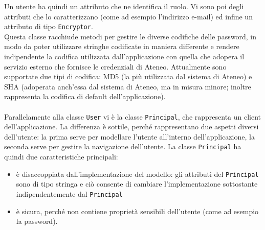 Un utente ha quindi un attributo che ne identifica il ruolo. Vi sono poi degli attributi che lo caratterizzano (come ad esempio l'indirizzo e-mail) ed infine un attributo di tipo \texttt{Encryptor}. \\
Questa classe racchiude metodi per gestire le diverse codifiche delle password, in modo da poter utilizzare stringhe codificate in maniera differente e rendere indipendente la codifica utilizzata dall'applicazione con quella che adopera il servizio esterno che fornisce le credenziali di Ateneo. Attualmente sono supportate due tipi di codifica: MD5 (la più utilizzata dal sistema di Ateneo) e SHA (adoperata anch'essa dal sistema di Ateneo, ma in misura minore; inoltre rappresenta la codifica di default dell'applicazione).\\
\\

Parallelamente alla classe \texttt{User} vi è la classe \texttt{Principal}, che rappresenta un client dell'applicazione. La differenza è sottile, perché rappresentano due aspetti diversi dell'utente: la prima serve per modellare l'utente all'interno dell'applicazione, la seconda serve per gestire la navigazione dell'utente. La classe \texttt{Principal} ha quindi due caratteristiche principali:
\begin{itemize}
\item è disaccoppiata dall'implementazione del modello: gli attributi del \texttt{Principal} sono di tipo stringa e ciò consente di cambiare l'implementazione sottostante indipendentemente dal \texttt{Principal}
\item è sicura, perché non contiene proprietà sensibili dell'utente (come ad esempio la password).
\end{itemize}



